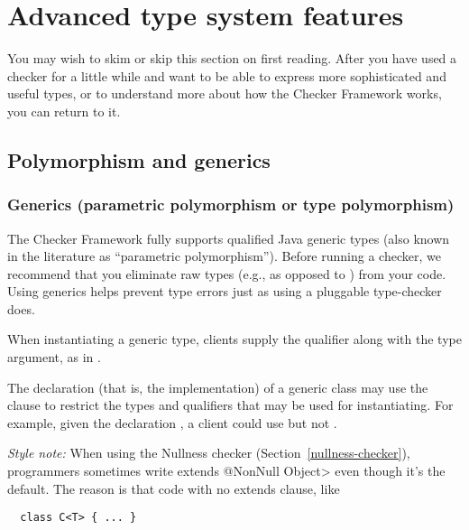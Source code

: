 \section{Advanced type system features\label{advanced-type-system-features}}

You may wish to skim or skip this section on first reading.  After you have
used a checker for a little while and want to be able to express more
sophisticated and useful types, or to understand more about how the Checker
Framework works, you can return to it.


\subsection{Polymorphism and generics\label{polymorphism}}

\subsubsection{Generics (parametric polymorphism or type polymorphism)\label{generics}}

The Checker Framework fully supports 
qualified Java generic types (also known in the literature as ``parametric
polymorphism'').  Before running a checker, we recommend that you eliminate
raw types (e.g.,  as opposed to ) from your code.
Using generics helps prevent type errors just as using a pluggable
type-checker does.

When instantiating a generic type, 
clients supply the qualifier along with the type argument, as in
.

The declaration (that is, the implementation) of a generic class may use
the  clause to restrict the types and qualifiers that may be
used for instantiating.  For example, given the declaration , a client could use
 but not .

\emph{Style note:}
When using the Nullness checker (Section~\ref{nullness-checker}),
programmers sometimes write \<extends @NonNull Object> even though it's the 
default.
The reason is that code with no extends clause, like 

\begin{Verbatim}
  class C<T> { ... }
\end{Verbatim}

